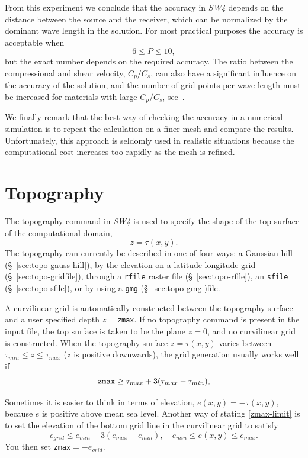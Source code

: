 \documentclass[11pt]{report}
\begin{document}
{From this experiment we conclude that the accuracy in \emph{SW4} depends on the distance between the
source and the receiver, which can be normalized by the dominant wave length in the solution. For
most practical purposes the accuracy is acceptable when
\[
	6 \leq P \leq 10,
\]
but the exact number depends on the required accuracy. The ratio between the compressional and shear
velocity, $C_p/C_s$, can also have a significant influence on the accuracy of the solution, and the
number of grid points per wave length must be increased for materials with large
$C_p/C_s$, see~\cite{KrePet-12}.

We finally remark that the best way of checking the accuracy in a numerical simulation is to repeat
the calculation on a finer mesh and compare the results. Unfortunately, this approach is seldomly
used in realistic situations because the computational cost increases too rapidly as the mesh is refined.

\chapter{Topography} \label{sec:topography}

The topography command in \emph{SW4} is used to specify the shape of the top surface of the
computational domain,
\[
	z=\tau(x,y).
\]
The topography can currently be described in one of four ways: a Gaussian hill
(\S~\ref{sec:topo-gauss-hill}), by the elevation on a latitude-longitude grid
(\S~\ref{sec:topo-gridfile}), through a \verb+rfile+ raster file (\S~\ref{sec:topo-rfile}), an \verb+sfile+ (\S~\ref{sec:topo-sfile}), or by
using a \verb+gmg+ (\S~\ref{sec:topo-gmg})file.

A curvilinear grid is automatically constructed between the topography surface and a user specified depth
$z=$\verb+zmax+. If no topography command is present in the input file, the top surface is taken to
be the plane $z=0$, and no curvilinear grid is constructed. When the topography surface $z=\tau(x,y)$ varies between
$\tau_{min}\leq z\leq \tau_{max}$ ($z$ is positive downwards), the grid generation usually works well if
\begin{equation}\label{zmax-limit}
	\mbox{\tt zmax} \geq \tau_{max} + 3(\tau_{max}-\tau_{min}),
\end{equation}

Sometimes it is easier to think in terms of elevation, $e(x,y)=-\tau(x,y)$, because $e$ is positive
above mean sea level. Another way of stating \eqref{zmax-limit} is to set the elevation of the
bottom grid line in the curvilinear grid to satisfy
\begin{equation}
	\label{elev-limit}
	e_{grid} \leq e_{min} - 3(e_{max} - e_{min}),\quad e_{min}\leq e(x,y) \leq e_{max}.
\end{equation}
You then set \verb+zmax+$=-e_{grid}$.

}
\end{document}
